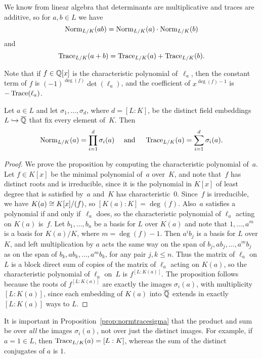 We know from linear algebra that
determinants are multiplicative
and traces are additive, so for $a,b\in L$ we have
\[
  \operatorname{Norm}_{L/K}(ab) = \operatorname{Norm}_{L/K}(a)\cdot \operatorname{Norm}_{L/K}(b)
\]
and
\[
  \operatorname{Trace}_{L/K}(a+b) = \operatorname{Trace}_{L/K}(a) + \operatorname{Trace}_{L/K}(b).
\]

Note that if $f\in\mathbb{Q}[x]$ is the characteristic polynomial of~$\ell_a$,
then the constant term of $f$ is $(-1)^{\deg(f)}\det(\ell_a)$, and the
coefficient of $x^{\deg(f)-1}$ is $-\operatorname{Trace}(\ell_a)$.

\begin{proposition}\label{prop:normtracesigma}
  Let $a\in L$ and let $\sigma_1,\dots, \sigma_d$, where $d=[L:K]$, be
  the distinct field embeddings $L \hookrightarrow \overline{\mathbb{Q}}$ that fix every element
  of~$K$.  Then
  \[
    \operatorname{Norm}_{L/K}(a) = \prod_{i=1}^d \sigma_i(a)
    \quad\text{ and }\quad
    \operatorname{Trace}_{L/K}(a) = \sum_{i=1}^d \sigma_i(a).
  \]
\end{proposition}
\begin{proof}
  We prove the proposition by computing the characteristic
  polynomial of~$a$.  Let $f\in K[x]$ be the minimal polynomial
  of~$a$ over~$K$, and note that~$f$ has distinct roots and is
  irreducible, since it is the polynomial in $K[x]$ of least degree
  that is satisfied by~$a$ and~$K$ has characteristic~$0$.  Since~$f$
  is irreducible, we have $K(a) \cong K[x]/(f)$, so $[K(a):K]=\deg(f)$.
  Also~$a$ satisfies a polynomial if and only if~$\ell_a$ does, so the
  characteristic polynomial of $\ell_a$ acting on $K(a)$ is~$f$.  Let
  $b_1,\dots,b_n$ be a basis for $L$ over $K(a)$ and note that
  $1,\dots, a^m$ is a basis for $K(a)/K$, where $m=\deg(f)-1$.  Then
  $a^i b_j$ is a basis for $L$ over $K$, and left multiplication by
  $a$ acts the same way on the span of $b_j, a b_j, \dots, a^m b_j$
  as on the span of $b_k, a b_k, \dots, a^m b_k$, for any pair
  $j,k \leq n$.  Thus the matrix of $\ell_a$ on $L$ is a block direct sum
  of copies of the matrix of $\ell_a$ acting on $K(a)$, so the
  characteristic polynomial of $\ell_a$ on~$L$ is $f^{[L:K(a)]}$.  The
  proposition follows because the roots of $f^{[L:K(a)]}$ are exactly
  the images $\sigma_i(a)$, with multiplicity $[L:K(a)]$, since each
  embedding of $K(a)$ into $\overline{\mathbb{Q}}$ extends in exactly $[L:K(a)]$ ways
  to $L$.
\end{proof}

\begin{warning}
  It is important in Proposition~\ref{prop:normtracesigma} that
  the product and sum be over {\em all} the images $\sigma_i(a)$,
  not over just the distinct images.  For example, if $a=1\in L$, then
  $\operatorname{Trace}_{L/K}(a) = [L:K]$, whereas the sum of the distinct conjugates
  of $a$ is $1$.
\end{warning}

